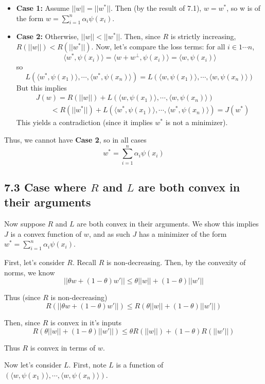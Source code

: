 \documentclass[paper=a4, fontsize=11pt]{scrartcl} %
\numberwithin{equation}{section} %
\numberwithin{figure}{section} %
\numberwithin{table}{section} %
\begin{document}
\begin{itemize}
\item \textbf{Case 1:} Assume $||w|| = ||w^*||$. Then (by the result of 7.1), $w = w^*$, so w is of the form $w = \sum_{i = 1}^n \alpha_i \psi(x_i)$.
\item \textbf{Case 2:} Otherwise, $||w|| < ||w^*||$. Then, since $R$ is strictly increasing, $R(||w||) < R(||w^*||)$. Now, let's compare the loss terms: for all $i \in 1\cdots n$,
\[\langle w^*, \psi(x_i)\rangle = \langle w + w^\perp, \psi(x_i)\rangle = \langle w , \psi(x_i)\rangle\]
so
\[L(\langle w^*, \psi(x_1)\rangle, \cdots, \langle w^*, \psi(x_n)\rangle) = L(\langle w, \psi(x_1)\rangle, \cdots, \langle w, \psi(x_n)\rangle)\]
But this implies
\begin{align*}
& J(w) = R(||w||) + L(\langle w, \psi(x_1)\rangle, \cdots, \langle w, \psi(x_n)\rangle) \\
& \qquad{} < R(||w^*||) + L(\langle w^*, \psi(x_1)\rangle, \cdots, \langle w^*, \psi(x_n)\rangle) = J(w^*)
\end{align*}
This yields a contradiction (since it implies $w^*$ is not a minimizer).
\end{itemize}
Thus, we cannot have \textbf{Case 2}, so in all cases
\[w^* = \sum_{i = 1}^n \alpha_i \psi(x_i)\]

\subsection*{7.3 Case where $R$ and $L$ are both convex in their arguments}

Now suppose $R$ and $L$ are both convex in their arguments. We show this implies $J$ is a convex function of $w$, and as such $J$ has a minimizer of the form $w^* = \sum_{i=1}^n \alpha_i \psi(x_i)$.

First, let's consider $R$. Recall $R$ is non-decreasing. Then, by the convexity of norms, we know
\[||\theta w + (1 - \theta)w'|| \leq \theta ||w|| + (1 - \theta) ||w'||\]

Thus (since $R$ is non-decreasing)
\[R(||\theta w + (1 - \theta)w'||) \leq R(\theta ||w|| + (1 - \theta) ||w'||)\]

Then, since $R$ is convex in it's inputs
\[R(\theta ||w|| + (1 - \theta) ||w'||) \leq \theta R(||w||) + (1 - \theta) R(||w'||)\]

Thus $R$ is convex in terms of $w$.

Now let's consider $L$. First, note $L$ is a function of $(\langle w , \psi(x_1)\rangle, \cdots, \langle  w , \psi(x_n)\rangle)$.
\end{document}
